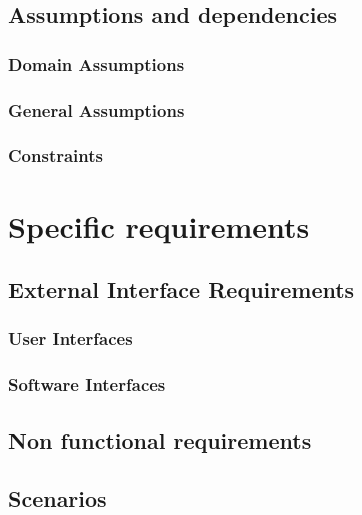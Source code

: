 \documentclass[12pt]{article}
\begin{document}
	\subsection{Assumptions and dependencies}
	\subsubsection{Domain Assumptions}
	
	
	\subsubsection{General Assumptions}
	
	\subsubsection{Constraints}
	
	
	\clearpage
	\section{Specific requirements}
	\subsection{External Interface Requirements}
	\subsubsection{User Interfaces}
	\clearpage
	\subsubsection{Software Interfaces}
	
	\subsection{Non functional requirements}	
	\subsection{Scenarios}
\end{document}
